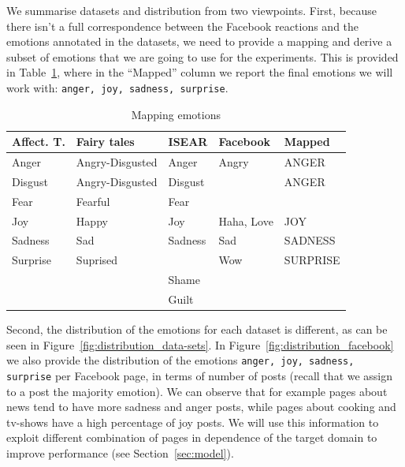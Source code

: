 \documentclass[11pt]{article}
\begin{document}
We summarise datasets and distribution from two viewpoints. First, because there isn't a full correspondence between the Facebook reactions and the emotions annotated in the datasets, we need to provide a mapping and derive a subset of emotions that we are going to use for the experiments. This is provided in Table~\ref{overview_data-sets}, where in the ``Mapped'' column we report the final emotions we will work with: \texttt{anger, joy, sadness, surprise}. 
\begin{table}
\begin{small}
\caption{Mapping emotions\label{overview_data-sets}}
\centering
\begin{tabular}{|l|l|l|l|l|}
\hline
\textbf{Affect. T.} & \textbf{Fairy tales} & \textbf{ISEAR} & \textbf{Facebook} & \textbf{Mapped} \\ \hline
Anger            & Angry-Disgusted      & Anger               & Angry   & ANGER          \\ \hline
Disgust          & Angry-Disgusted      & Disgust               &    &  ANGER              \\ \hline
Fear             & Fearful              & Fear               &      &              \\ \hline
Joy              & Happy                & Joy                & Haha, Love & JOY\\ \hline
Sadness          & Sad                  & Sadness               & Sad     & SADNESS          \\ \hline
Surprise         & Suprised             &                & Wow          & SURPRISE     \\ 
\hline
                 &                      & Shame               &       &         \\ \hline
                 &                      & Guilt               &       &         \\                  
\hline
\end{tabular}
\end{small}
\end{table}
Second, the distribution of the emotions for each dataset is different, as can be seen in Figure~\ref{fig:distribution_data-sets}. 
In Figure~\ref{fig:distribution_facebook} we also provide the distribution of the emotions \texttt{anger, joy, sadness, surprise} per Facebook page, in terms of number of posts (recall that we assign to a post the majority emotion). We can observe that for example pages about news  tend to have more sadness and anger posts, while pages about cooking and tv-shows have a high percentage of joy posts. We will use this information to exploit different combination of pages in dependence of the target domain to improve performance (see Section~\ref{sec:model}).
\end{document}
